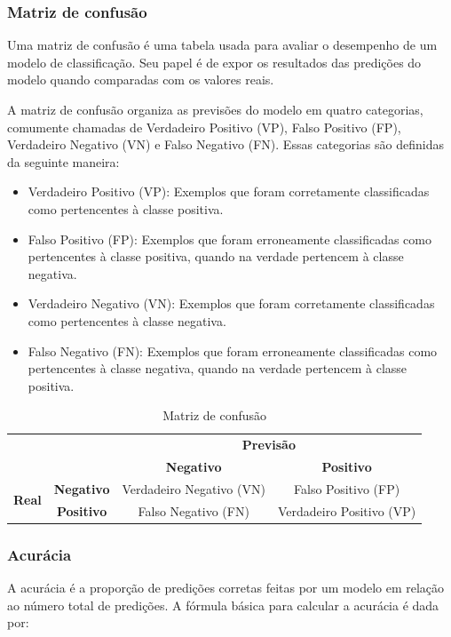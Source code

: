 \subsubsection{Matriz de confusão}

Uma matriz de confusão é uma tabela usada para avaliar o desempenho de um modelo de classificação.
Seu papel é de expor os resultados das predições do modelo quando comparadas com os valores reais.

A matriz de confusão organiza as previsões do modelo em quatro categorias, comumente chamadas de Verdadeiro Positivo (VP), 
Falso Positivo (FP), Verdadeiro Negativo (VN) e Falso Negativo (FN). Essas categorias são definidas da seguinte maneira:

\begin{itemize}
  \item Verdadeiro Positivo (VP): Exemplos que foram corretamente classificadas como pertencentes à classe positiva.
  \item Falso Positivo (FP): Exemplos que foram erroneamente classificadas como pertencentes à classe positiva, quando na verdade pertencem à classe negativa.
  \item Verdadeiro Negativo (VN): Exemplos que foram corretamente classificadas como pertencentes à classe negativa. 
  \item Falso Negativo (FN): Exemplos que foram erroneamente classificadas como pertencentes à classe negativa, quando na verdade pertencem à classe positiva.
\end{itemize}

\begin{table}[h]
  \centering
  \begin{tabular}{cc|cc|}
    \cline{3-4}
  & & \multicolumn{2}{c|}{\textbf{Previsão}} \\ \cline{3-4}
  & & \textbf{Negativo} & \textbf{Positivo} \\ \hline
  \multicolumn{1}{|c|}{\multirow{2}{*}{\textbf{Real}}} & \textbf{Negativo} & Verdadeiro Negativo (VN) & Falso Positivo (FP) \\  
  \multicolumn{1}{|c|}{} & \textbf{Positivo} & Falso Negativo (FN) & Verdadeiro Positivo (VP) \\ \hline
  \end{tabular}
  \caption{Matriz de confusão}
  \label{table:confusion_matrix}
\end{table}

\subsubsection{Acurácia}
A acurácia é a proporção de predições corretas feitas por um modelo em relação ao número total de predições. 
A fórmula básica para calcular a acurácia é dada por:

